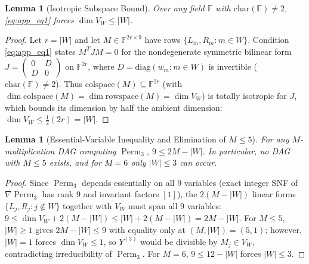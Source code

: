 \documentclass[11pt,a4paper]{article}
\newtheorem{lemma}[theorem]{Lemma}
\newcommand{\Perm}{\operatorname{Perm}}
\newcommand{\F}{\mathbb{F}}
\begin{document}
\begin{lemma}[Isotropic Subspace Bound]
Over any field $\F$ with $\mathrm{char}(\F) \neq 2$, \eqref{eq:app_eq1} forces $\dim V_W \le |W|$.
\end{lemma}
\begin{proof}
Let $r = |W|$ and let $M \in \F^{2r \times 9}$ have rows $\{L_m, R_m : m \in W\}$. Condition \eqref{eq:app_eq1} states $M^T J M = 0$ for the nondegenerate symmetric bilinear form $J = \begin{pmatrix} 0 & D \\ D & 0 \end{pmatrix}$ on $\F^{2r}$, where $D = \mathrm{diag}(w_m : m \in W)$ is invertible ($\mathrm{char}(\F) \neq 2$). Thus $\mathrm{colspace}(M) \subseteq \F^{2r}$ (with $\dim \mathrm{colspace}(M) = \dim \mathrm{rowspace}(M) = \dim V_W$) is totally isotropic for $J$, which bounds its dimension by half the ambient dimension: $\dim V_W \le \frac{1}{2}(2r) = |W|$.
\end{proof}

\begin{lemma}[Essential-Variable Inequality and Elimination of $M \le 5$]
For any $M$-multiplication DAG computing $\Perm_3$, $9 \le 2M - |W|$. In particular, no DAG with $M \le 5$ exists, and for $M = 6$ only $|W| \le 3$ can occur.
\end{lemma}
\begin{proof}
Since $\Perm_3$ depends essentially on all $9$ variables (exact integer SNF of $\nabla \Perm_3$ has rank $9$ and invariant factors $[1]$), the $2(M - |W|)$ linear forms $\{L_j, R_j : j \notin W\}$ together with $V_W$ must span all $9$ variables: $9 \le \dim V_W + 2(M - |W|) \le |W| + 2(M - |W|) = 2M - |W|$. For $M \le 5$, $|W| \ge 1$ gives $2M - |W| \le 9$ with equality only at $(M,|W|) = (5,1)$; however, $|W| = 1$ forces $\dim V_W \le 1$, so $Y^{(3)}$ would be divisible by $M_j \in V_W$, contradicting irreducibility of $\Perm_3$. For $M = 6$, $9 \le 12 - |W|$ forces $|W| \le 3$.
\end{proof}
\end{document}

